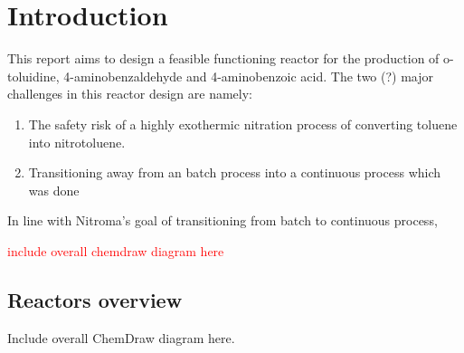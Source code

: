 \section{Introduction}
This report aims to design a feasible functioning reactor for the production of o-toluidine, 4-aminobenzaldehyde and 4-aminobenzoic acid. The two (?) major challenges in this reactor design are namely:
\begin{enumerate}
    \item The safety risk of a highly exothermic nitration process of converting toluene into nitrotoluene. 
    \item Transitioning away from an batch process into a continuous process which was done 
\end{enumerate}

In line with Nitroma's goal of transitioning from batch to continuous process, 


\textcolor{red}{include overall chemdraw diagram here}
\subsection{Reactors overview}
Include overall ChemDraw diagram here. 




